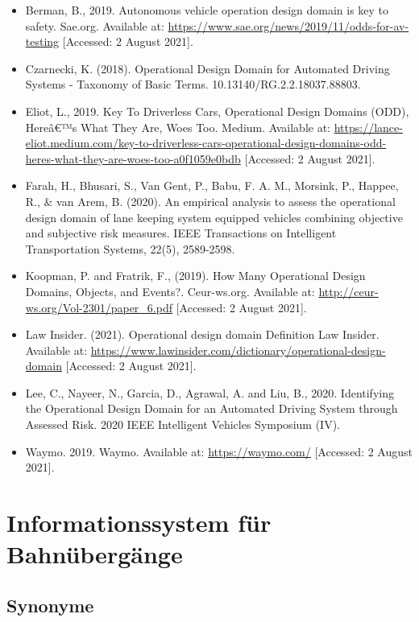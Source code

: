 \documentclass[
]{book}
\providecommand{\tightlist}{%
  \setlength{\itemsep}{0pt}\setlength{\parskip}{0pt}}
\begin{document}
\begin{itemize}
\tightlist
\item
  Berman, B., 2019. Autonomous vehicle operation design domain is key to safety. Sae.org. Available at: \url{https://www.sae.org/news/2019/11/odds-for-av-testing} {[}Accessed: 2 August 2021{]}.
\item
  Czarnecki, K. (2018). Operational Design Domain for Automated Driving Systems - Taxonomy of Basic Terms. 10.13140/RG.2.2.18037.88803.
\item
  Eliot, L., 2019. Key To Driverless Cars, Operational Design Domains (ODD), Hereâ€™s What They Are, Woes Too. Medium. Available at: \url{https://lance-eliot.medium.com/key-to-driverless-cars-operational-design-domains-odd-heres-what-they-are-woes-too-a0f1059e0bdb} {[}Accessed: 2 August 2021{]}.
\item
  Farah, H., Bhusari, S., Van Gent, P., Babu, F. A. M., Morsink, P., Happee, R., \& van Arem, B. (2020). An empirical analysis to assess the operational design domain of lane keeping system equipped vehicles combining objective and subjective risk measures. IEEE Transactions on Intelligent Transportation Systems, 22(5), 2589-2598.
\item
  Koopman, P. and Fratrik, F., (2019). How Many Operational Design Domains, Objects, and Events?. Ceur-ws.org. Available at: \url{http://ceur-ws.org/Vol-2301/paper_6.pdf} {[}Accessed: 2 August 2021{]}.
\item
  Law Insider. (2021). Operational design domain Definition \textbar{} Law Insider. Available at: \url{https://www.lawinsider.com/dictionary/operational-design-domain} {[}Accessed: 2 August 2021{]}.
\item
  Lee, C., Nayeer, N., Garcia, D., Agrawal, A. and Liu, B., 2020. Identifying the Operational Design Domain for an Automated Driving System through Assessed Risk. 2020 IEEE Intelligent Vehicles Symposium (IV).
\item
  Waymo. 2019. Waymo. Available at: \url{https://waymo.com/} {[}Accessed: 2 August 2021{]}.
\end{itemize}

\hypertarget{rail_crossing_info_system}{%
\section{Informationssystem für Bahnübergänge}\label{rail_crossing_info_system}}

\hypertarget{synonyme-2}{%
\subsection*{Synonyme}\label{synonyme-2}}
\end{document}

